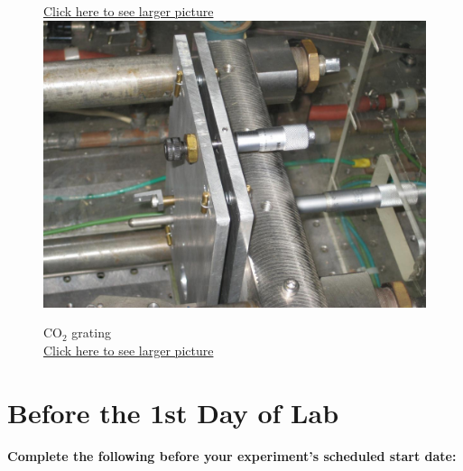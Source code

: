 \documentclass{../lab}
\begin{document}
\begin{figure}[H]
{  \href{http://experimentationlab.berkeley.edu/sites/default/files/CO-2/CO2_Optics_3567_0.JPG}{Click here to see larger picture}}
  \label{fig:OpticalAlignment}
\endminipage\hfill
{}
  \href{http://experimentationlab.berkeley.edu/sites/default/files/CO-2/Co-2-Grating_3641_0.JPG}{\includegraphics[width=\linewidth,keepaspectratio]{images/Co-2-Grating_3641_0.JPG}}
  \caption{CO$_2$ grating \\ \href{http://experimentationlab.berkeley.edu/sites/default/files/CO-2/Co-2-Grating_3641_0.JPG}{Click here to see larger picture}}\label{fig:Grating}
\endminipage
\end{figure}

\pagebreak

\section{Before the 1st Day of Lab}

\textbf{Complete the following before your experiment's scheduled start date:}
\end{document}
